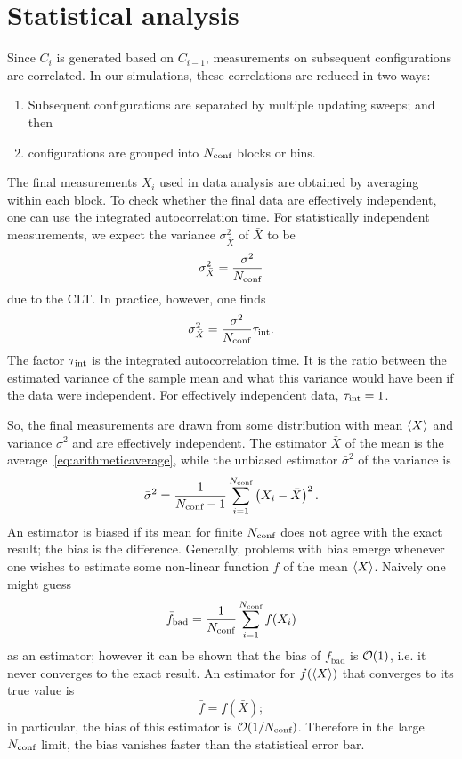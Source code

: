 \section{Statistical analysis}\label{sec:statana}

Since $C_i$ is generated based on $C_{i-1}$, measurements on subsequent
configurations are correlated. In our simulations, these
correlations are reduced in two ways:
\begin{enumerate}
  \item Subsequent configurations are separated by multiple updating sweeps;
        and then
  \item configurations are grouped into $N_{\text{conf}}$ blocks or bins.
\end{enumerate}
The final measurements $X_i$ used in data analysis are obtained by averaging
within each block.
To check whether the final data are effectively independent, one can use
the integrated autocorrelation time. 
For statistically independent measurements, we expect the variance 
$\sigma^2_{\bar{X}}$ of $\bar{X}$ to be
\begin{equation}
  \sigma^2_{\bar{X}}=\frac{\sigma^2}{N_{\text{conf}}}
\end{equation}
due to the CLT. In practice, however, one finds 
\begin{equation}
  \sigma^2_{\bar{X}}=\frac{\sigma^2}{N_{\text{conf}}}\tau_\text{int}.
\end{equation}
The factor $\tau_\text{int}$ is the integrated autocorrelation time. It is the 
ratio between the estimated variance of the sample
mean and what this variance would have been if the data were independent.
For effectively independent data, $\tau_\text{int}=1$.

So, the final measurements are drawn from some
distribution with mean $\ev{X}$ and variance $\sigma^2$
and are effectively independent. The
estimator $\bar{X}$ of the mean is the average~\eqref{eq:arithmeticaverage}, 
while the unbiased estimator $\bar{\sigma}^2$ of the variance is
\begin{equation}\label{eq:estimatorvariance}
  \bar{\sigma}^2=\frac{1}{N_{\text{conf}}-1}\sum_{i=1}^{N_{\text{conf}}}
      \left(X_i-\bar{X}\right)^2.
\end{equation}
An estimator is biased if its mean for finite $N_{\text{conf}}$ 
does not agree with the exact result;
the bias is the difference. Generally, problems with bias emerge whenever
one wishes to estimate some non-linear function $f$ of the mean $\ev{X}$.
Naively one might guess
\begin{equation}
  \bar{f}_\text{bad}=\frac{1}{N_{\text{conf}}}\sum_{i=1}^{N_{\text{conf}}}f(X_i)
\end{equation}
as an estimator; however it can be shown that the bias of 
$\bar{f}_\text{bad}$ is $\order{1}$,
i.e. it never converges to the exact result.
An estimator for $f(\ev{X})$ that converges to its true value is
\begin{equation}
  \bar{f}=f(\bar{X});
\end{equation}
in particular, the bias of this estimator is $\order{1/\nconf}$.
Therefore in the large $N_{\text{conf}}$ limit, the bias vanishes faster than the 
statistical error bar.

